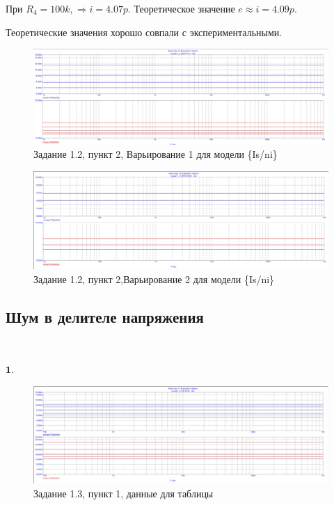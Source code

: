 \documentclass[a4paper, 14pt]{extarticle}%
\begin{document}
При $R_4 = 100k, \Rightarrow  i = 4.07p$.
Теоретическое значение $e \approx i = 4.09p$.

Теоретические значения хорошо совпали с экспериментальными.


\begin{figure}[h!]
			\centering
			\includegraphics[width=1.1\linewidth]{1.2/pic6.jpg}
			\caption{Задание 1.2, пункт 2, Варьирование 1 для модели \{Is/ni\}}
			\label{A}
\end{figure}

\begin{figure}[h!]
			\centering
			\includegraphics[width=1.1\linewidth]{1.2/pic7.jpg}
			\caption{Задание 1.2, пункт 2,Варьирование 2 для модели \{Is/ni\}}
			\label{A}
\end{figure}


\subsection{Шум в делителе напряжения}

$ $

$\textbf{1. }$


\begin{figure}[h!]
			\centering
			\includegraphics[width=1.1\linewidth]{1.3/pic8.jpg}
			\caption{Задание 1.3, пункт 1, данные для таблицы}
			\label{A}
\end{figure}
\end{document}
